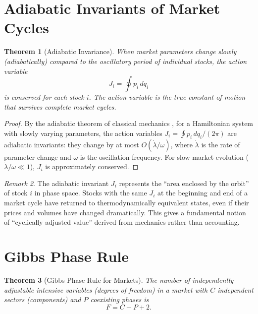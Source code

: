 \documentclass[twocolumn,10pt]{article}
\newtheorem{theorem}{Theorem}[section]
\theoremstyle{remark}
\newtheorem{remark}[theorem]{Remark}
\begin{document}
\section{Adiabatic Invariants of Market Cycles}
\label{sec:adiabatic}

\begin{theorem}[Adiabatic Invariance]
\label{thm:adiabatic}
When market parameters change slowly (adiabatically) compared to the oscillatory period of individual stocks, the action variable
\begin{equation}
    J_i = \oint p_i \, dq_i
    \label{eq:action}
\end{equation}
is conserved for each stock $i$.  The action variable is the true constant of motion that survives complete market cycles.
\end{theorem}

\begin{proof}
By the adiabatic theorem of classical mechanics \cite{arnold1978,goldstein2002}, for a Hamiltonian system with slowly varying parameters, the action variables $J_i = \oint p_i \, dq_i / (2\pi)$ are adiabatic invariants: they change by at most $O(\dot{\lambda} / \omega)$, where $\dot{\lambda}$ is the rate of parameter change and $\omega$ is the oscillation frequency.  For slow market evolution ($\dot{\lambda} / \omega \ll 1$), $J_i$ is approximately conserved.
\end{proof}

\begin{remark}
The adiabatic invariant $J_i$ represents the ``area enclosed by the orbit'' of stock $i$ in phase space.  Stocks with the same $J_i$ at the beginning and end of a market cycle have returned to thermodynamically equivalent states, even if their prices and volumes have changed dramatically.  This gives a fundamental notion of ``cyclically adjusted value'' derived from mechanics rather than accounting.
\end{remark}


\section{Gibbs Phase Rule}
\label{sec:gibbs_phase}

\begin{theorem}[Gibbs Phase Rule for Markets]
\label{thm:gibbs}
The number of independently adjustable intensive variables (degrees of freedom) in a market with $C$ independent sectors (components) and $P$ coexisting phases is
\begin{equation}
    \boxed{F = C - P + 2}.
    \label{eq:gibbs_phase_rule}
\end{equation}
\end{theorem}
\end{document}

